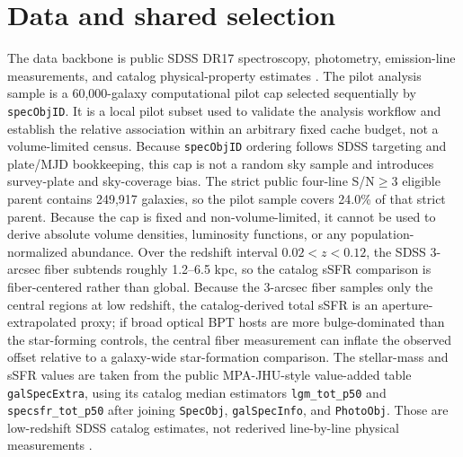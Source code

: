 \documentclass[twocolumn]{aastex631}
\begin{document}
\section{Data and shared selection}
The data backbone is public SDSS DR17 spectroscopy, photometry, emission-line measurements, and catalog physical-property estimates \citep{york2000,sdssdr17,brinchmann2004}. The pilot analysis sample is a 60,000-galaxy computational pilot cap selected sequentially by \texttt{specObjID}. It is a local pilot subset used to validate the analysis workflow and establish the relative association within an arbitrary fixed cache budget, not a volume-limited census. Because \texttt{specObjID} ordering follows SDSS targeting and plate/MJD bookkeeping, this cap is not a random sky sample and introduces survey-plate and sky-coverage bias. The strict public four-line S/N$\geq3$ eligible parent contains 249,917 galaxies, so the pilot sample covers 24.0\% of that strict parent. Because the cap is fixed and non-volume-limited, it cannot be used to derive absolute volume densities, luminosity functions, or any population-normalized abundance.
Over the redshift interval $0.02<z<0.12$, the SDSS 3-arcsec fiber subtends roughly 1.2--6.5 kpc, so the catalog sSFR comparison is fiber-centered rather than global.
Because the 3-arcsec fiber samples only the central regions at low redshift, the catalog-derived total sSFR is an aperture-extrapolated proxy; if broad optical BPT hosts are more bulge-dominated than the star-forming controls, the central fiber measurement can inflate the observed offset relative to a galaxy-wide star-formation comparison.
The stellar-mass and sSFR values are taken from the public MPA-JHU-style value-added table \texttt{galSpecExtra}, using its catalog median estimators \texttt{lgm\_tot\_p50} and \texttt{specsfr\_tot\_p50} after joining \texttt{SpecObj}, \texttt{galSpecInfo}, and \texttt{PhotoObj}. Those are low-redshift SDSS catalog estimates, not rederived line-by-line physical measurements \citep{brinchmann2004,sdssdr17,york2000}.
\end{document}

